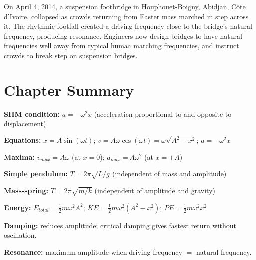 \begin{realworldbox}
On April 4, 2014, a suspension footbridge in Houphouet-Boigny,
Abidjan, Côte d'Ivoire, collapsed as crowds returning
from Easter mass marched in step across it. The rhythmic
footfall created a driving frequency close to the
bridge's natural frequency, producing resonance.
Engineers now design bridges to have natural
frequencies well away from typical human marching
frequencies, and instruct crowds to break step on
suspension bridges.
\end{realworldbox}

\section{Chapter Summary}

\begin{summarybox}
\textbf{SHM condition:} $a = -\omega^2 x$
(acceleration proportional to and opposite to
displacement)

\textbf{Equations:}
$x = A\sin(\omega t)$;
$v = A\omega\cos(\omega t) = \omega\sqrt{A^2-x^2}$;
$a = -\omega^2 x$

\textbf{Maxima:}
$v_{max} = A\omega$ (at $x=0$);
$a_{max} = A\omega^2$ (at $x=\pm A$)

\textbf{Simple pendulum:}
$T = 2\pi\sqrt{L/g}$
(independent of mass and amplitude)

\textbf{Mass-spring:}
$T = 2\pi\sqrt{m/k}$
(independent of amplitude and gravity)

\textbf{Energy:}
$E_{total} = \frac{1}{2}m\omega^2 A^2$;
$KE = \frac{1}{2}m\omega^2(A^2-x^2)$;
$PE = \frac{1}{2}m\omega^2 x^2$

\textbf{Damping:} reduces amplitude; critical damping
gives fastest return without oscillation.

\textbf{Resonance:} maximum amplitude when driving
frequency $=$ natural frequency.
\end{summarybox}

